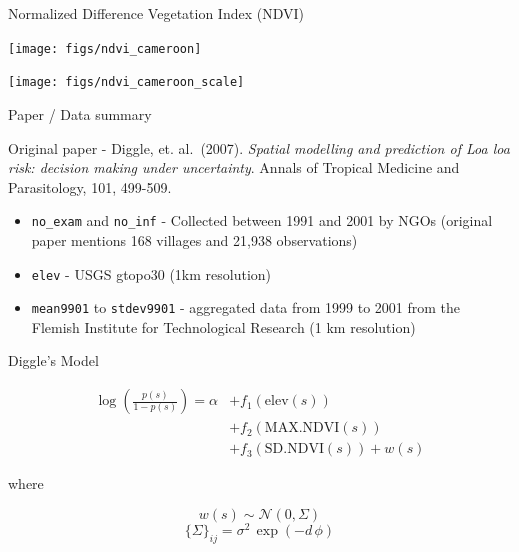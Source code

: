 \documentclass[11pt,ignorenonframetext,]{beamer}
\providecommand{\tightlist}{%
  \setlength{\itemsep}{0pt}\setlength{\parskip}{0pt}}
\begin{document}
\begin{frame}[t]{Normalized Difference Vegetation Index (NDVI)}
\protect\hypertarget{normalized-difference-vegetation-index-ndvi}{}

\vspace{-2.5mm}

\begin{center}\texttt{[image: figs/ndvi\_cameroon]} \end{center}

\begin{center}\texttt{[image: figs/ndvi\_cameroon\_scale]} \end{center}

\end{frame}

\begin{frame}[fragile]{Paper / Data summary}
\protect\hypertarget{paper-data-summary}{}

Original paper - Diggle, et. al.~(2007). \emph{Spatial modelling and
prediction of Loa loa risk: decision making under uncertainty}. Annals
of Tropical Medicine and Parasitology, 101, 499-509.

\vspace{4mm}

\begin{itemize}
\tightlist
\item
  \texttt{no\_exam} and \texttt{no\_inf} - Collected between 1991 and
  2001 by NGOs (original paper mentions 168 villages and 21,938
  observations)
\end{itemize}

\vspace{2mm}

\begin{itemize}
\tightlist
\item
  \texttt{elev} - USGS gtopo30 (1km resolution)
\end{itemize}

\vspace{2mm}

\begin{itemize}
\tightlist
\item
  \texttt{mean9901} to \texttt{stdev9901} - aggregated data from 1999 to
  2001 from the Flemish Institute for Technological Research (1 km
  resolution)
\end{itemize}

\end{frame}

\begin{frame}{Diggle's Model}
\protect\hypertarget{diggles-model}{}

\[ 
\begin{aligned}
\log \left( \frac{p(s)}{1-p(s)} \right) = \alpha &+ f_1(\text{elev}(s)) \\
&+ f_2(\text{MAX.NDVI}(s)) \\
&+ f_3(\text{SD.NDVI}(s)) + w(s) 
\end{aligned}
\]

where

\[ w(s) \sim \mathcal{N}(0, \Sigma) \]
\[ \{\Sigma\}_{ij} = \sigma^2 \, \exp(-d \,\phi) \]

\end{frame}
\end{document}
